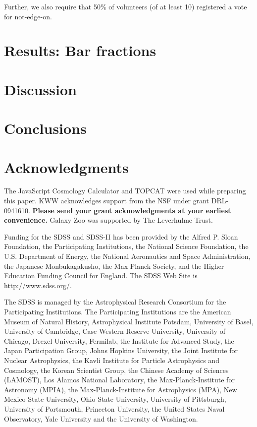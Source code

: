 \documentclass[useAMS,usenatbib]{mn2e}
\begin{document}
Further, we also require that 50\% of volunteers (of at least 10) registered a vote for not-edge-on. 

%
%
\section{Results: Bar fractions}\label{sec:results}
%
%


%
%  
\section{Discussion}\label{sec:discussion}
%
%

%
%  
\section{Conclusions}\label{sec:conclusions}
%
%

%
%
\section*{Acknowledgments}
%
%

%
The JavaScript Cosmology Calculator \citep{wri06} and TOPCAT \citep{tay05,tay11} were used while preparing this paper. 
%
KWW acknowledges support from the NSF under grant DRL-0941610.
%
\textbf{Please send your grant acknowledgments at your earliest convenience.}
%
Galaxy Zoo was supported by The Leverhulme Trust. 


Funding for the SDSS and SDSS-II has been provided by the Alfred P. Sloan Foundation, the Participating Institutions, the National Science Foundation, the U.S. Department of Energy, the National Aeronautics and Space Administration, the Japanese Monbukagakusho, the Max Planck Society, and the Higher Education Funding Council for England. The SDSS Web Site is http://www.sdss.org/.

The SDSS is managed by the Astrophysical Research Consortium for the Participating Institutions. The Participating Institutions are the American Museum of Natural History, Astrophysical Institute Potsdam, University of Basel, University of Cambridge, Case Western Reserve University, University of Chicago, Drexel University, Fermilab, the Institute for Advanced Study, the Japan Participation Group, Johns Hopkins University, the Joint Institute for Nuclear Astrophysics, the Kavli Institute for Particle Astrophysics and Cosmology, the Korean Scientist Group, the Chinese Academy of Sciences (LAMOST), Los Alamos National Laboratory, the Max-Planck-Institute for Astronomy (MPIA), the Max-Planck-Institute for Astrophysics (MPA), New Mexico State University, Ohio State University, University of Pittsburgh, University of Portsmouth, Princeton University, the United States Naval Observatory, Yale University and the University of Washington. 
  
  
\end{document}
